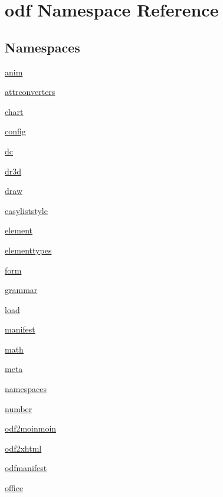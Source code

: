 \hypertarget{namespaceodf}{\section{odf Namespace Reference}
\label{namespaceodf}
}
\subsection*{Namespaces}
\begin{DoxyCompactItemize}
\item 
 \hyperlink{namespaceodf_1_1anim}{anim}
\item 
 \hyperlink{namespaceodf_1_1attrconverters}{attrconverters}
\item 
 \hyperlink{namespaceodf_1_1chart}{chart}
\item 
 \hyperlink{namespaceodf_1_1config}{config}
\item 
 \hyperlink{namespaceodf_1_1dc}{dc}
\item 
 \hyperlink{namespaceodf_1_1dr3d}{dr3d}
\item 
 \hyperlink{namespaceodf_1_1draw}{draw}
\item 
 \hyperlink{namespaceodf_1_1easyliststyle}{easyliststyle}
\item 
 \hyperlink{namespaceodf_1_1element}{element}
\item 
 \hyperlink{namespaceodf_1_1elementtypes}{elementtypes}
\item 
 \hyperlink{namespaceodf_1_1form}{form}
\item 
 \hyperlink{namespaceodf_1_1grammar}{grammar}
\item 
 \hyperlink{namespaceodf_1_1load}{load}
\item 
 \hyperlink{namespaceodf_1_1manifest}{manifest}
\item 
 \hyperlink{namespaceodf_1_1math}{math}
\item 
 \hyperlink{namespaceodf_1_1meta}{meta}
\item 
 \hyperlink{namespaceodf_1_1namespaces}{namespaces}
\item 
 \hyperlink{namespaceodf_1_1number}{number}
\item 
 \hyperlink{namespaceodf_1_1odf2moinmoin}{odf2moinmoin}
\item 
 \hyperlink{namespaceodf_1_1odf2xhtml}{odf2xhtml}
\item 
 \hyperlink{namespaceodf_1_1odfmanifest}{odfmanifest}
\item 
 \hyperlink{namespaceodf_1_1office}{office}
\item 

\end{DoxyCompactItemize}
